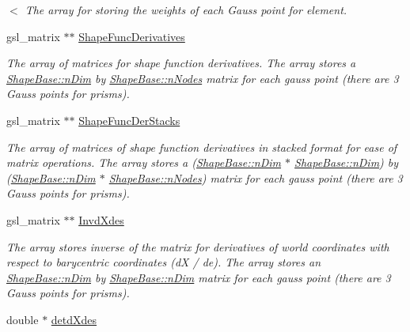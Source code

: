 \begin{DoxyCompactItemize}
\begin{DoxyCompactList}\small\item\em $<$ The array for storing the weights of each Gauss point for element. \end{DoxyCompactList}\item 
\hypertarget{classShapeBase_a80a8943320a0cdc871565acded52b239}{}gsl\+\_\+matrix $\ast$$\ast$ \hyperlink{classShapeBase_a80a8943320a0cdc871565acded52b239}{Shape\+Func\+Derivatives}\label{classShapeBase_a80a8943320a0cdc871565acded52b239}

\begin{DoxyCompactList}\small\item\em The array of matrices for shape function derivatives. The array stores a \hyperlink{classShapeBase_a250bd3396546342c8104f5b9c180d18f}{Shape\+Base\+::n\+Dim} by \hyperlink{classShapeBase_ae7dd93b58b3281ce90025f83d0f0e976}{Shape\+Base\+::n\+Nodes} matrix for each gauss point (there are 3 Gauss points for prisms). \end{DoxyCompactList}\item 
\hypertarget{classShapeBase_a23deaddf67b09f6fe5470f05385001fe}{}gsl\+\_\+matrix $\ast$$\ast$ \hyperlink{classShapeBase_a23deaddf67b09f6fe5470f05385001fe}{Shape\+Func\+Der\+Stacks}\label{classShapeBase_a23deaddf67b09f6fe5470f05385001fe}

\begin{DoxyCompactList}\small\item\em The array of matrices of shape function derivatives in stacked format for ease of matrix operations. The array stores a (\hyperlink{classShapeBase_a250bd3396546342c8104f5b9c180d18f}{Shape\+Base\+::n\+Dim} $\ast$ \hyperlink{classShapeBase_a250bd3396546342c8104f5b9c180d18f}{Shape\+Base\+::n\+Dim}) by (\hyperlink{classShapeBase_a250bd3396546342c8104f5b9c180d18f}{Shape\+Base\+::n\+Dim} $\ast$ \hyperlink{classShapeBase_ae7dd93b58b3281ce90025f83d0f0e976}{Shape\+Base\+::n\+Nodes}) matrix for each gauss point (there are 3 Gauss points for prisms). \end{DoxyCompactList}\item 
\hypertarget{classShapeBase_a4a5fc631abba61fa2488112a7a674377}{}gsl\+\_\+matrix $\ast$$\ast$ \hyperlink{classShapeBase_a4a5fc631abba61fa2488112a7a674377}{Invd\+Xdes}\label{classShapeBase_a4a5fc631abba61fa2488112a7a674377}

\begin{DoxyCompactList}\small\item\em The array stores inverse of the matrix for derivatives of world coordinates with respect to barycentric coordinates (d\+X / de). The array stores an \hyperlink{classShapeBase_a250bd3396546342c8104f5b9c180d18f}{Shape\+Base\+::n\+Dim} by \hyperlink{classShapeBase_a250bd3396546342c8104f5b9c180d18f}{Shape\+Base\+::n\+Dim} matrix for each gauss point (there are 3 Gauss points for prisms). \end{DoxyCompactList}\item 
\hypertarget{classShapeBase_ad1c2ef88314c7e567ca2bdcc6592f5ec}{}double $\ast$ \hyperlink{classShapeBase_ad1c2ef88314c7e567ca2bdcc6592f5ec}{detd\+Xdes}\label{classShapeBase_ad1c2ef88314c7e567ca2bdcc6592f5ec}


\end{DoxyCompactItemize}
